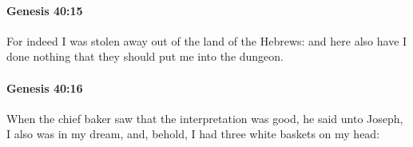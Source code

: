 		\paragraph{Genesis 40:15} %
			\label{GENESIS-40-15}

			For indeed I was stolen away out of the land of the Hebrews: and here also have I done nothing that they should put me into the dungeon.


		\paragraph{Genesis 40:16} %
			\label{GENESIS-40-16}

			When the chief baker saw that the interpretation was good, he said unto Joseph, I also was in my dream, and, behold, I had three white baskets on my head:


